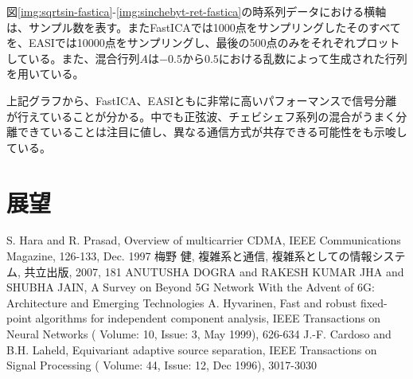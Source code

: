 \documentclass{jsarticle}
\begin{document}
図\ref{img:sqrtsin-fastica}-\ref{img:sinchebyt-ret-fastica}の時系列データにおける横軸は、サンプル数を表す。またFastICAでは1000点をサンプリングしたそのすべてを、EASIでは10000点をサンプリングし、最後の500点のみをそれぞれプロットしている。また、混合行列$A$は$-0.5$から$0.5$における乱数によって生成された行列を用いている。

上記グラフから、FastICA、EASIともに非常に高いパフォーマンスで信号分離が行えていることが分かる。中でも正弦波、チェビシェフ系列の混合がうまく分離できていることは注目に値し、異なる通信方式が共存できる可能性をも示唆している。

\section{展望}

\begin{thebibliography}{99}
     S. Hara and R. Prasad, Overview of multicarrier CDMA, IEEE Communications Magazine, 126-133, Dec. 1997
     梅野 健, 複雑系と通信, 複雑系としての情報システム,
    共立出版, 2007, 181
     ANUTUSHA DOGRA and RAKESH KUMAR JHA and SHUBHA JAIN, A Survey on Beyond 5G Network With the Advent of 6G: Architecture and Emerging Technologies
     A. Hyvarinen, Fast and robust fixed-point algorithms for independent component analysis, IEEE Transactions on Neural Networks ( Volume: 10, Issue: 3, May 1999), 626-634
     J.-F. Cardoso and B.H. Laheld, Equivariant adaptive source separation, IEEE Transactions on Signal Processing ( Volume: 44, Issue: 12, Dec 1996), 3017-3030
\end{thebibliography}
\end{document}
